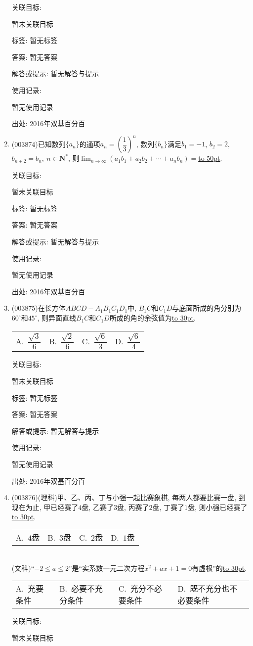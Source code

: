 \documentclass[10pt,a4paper]{article}
\newcommand{\blank}[1]{\underline{\hbox to #1pt{}}}
\newcommand{\fourch}[4]{\par\begin{tabular}{p{.23\textwidth}p{.23\textwidth}p{.23\textwidth}p{.23\textwidth}}
A.~#1 &B.~#2& C.~#3& D.~#4
\end{tabular}}
\begin{document}
\begin{enumerate}[1.]
关联目标:

暂未关联目标



标签: 暂无标签

答案: 暂无答案

解答或提示: 暂无解答与提示

使用记录:

暂无使用记录


出处: 2016年双基百分百
\item { (003874)}已知数列$\{a_n\}$的通项$a_n=\left(\dfrac 13\right)^n$, 数列$\{b_n\}$满足$b_1=-1$, $b_2=2$, $b_{n+2}=b_n, \ n\in \mathbf{N}^*$, 则$\displaystyle\lim_{n\to \infty}(a_1b_1+a_2b_2+\cdots+a_nb_n)=$\blank{50}.


关联目标:

暂未关联目标



标签: 暂无标签

答案: 暂无答案

解答或提示: 暂无解答与提示

使用记录:

暂无使用记录


出处: 2016年双基百分百
\item { (003875)}在长方体$ABCD-A_1B_1C_1D_1$中, $B_1C$和$C_1D$与底面所成的角分别为$60^\circ$和$45^\circ$, 则异面直线$B_1C$和$C_1D$所成的角的余弦值为\blank{30}.
\fourch{$\dfrac{\sqrt{3}}6$}{$\dfrac{\sqrt{2}}{6}$}{$\dfrac{\sqrt{6}}{3}$}{$\dfrac{\sqrt{6}}{4}$}


关联目标:

暂未关联目标



标签: 暂无标签

答案: 暂无答案

解答或提示: 暂无解答与提示

使用记录:

暂无使用记录


出处: 2016年双基百分百
\item { (003876)}(理科)甲、乙、丙、丁与小强一起比赛象棋, 每两人都要比赛一盘, 到现在为止, 甲已经赛了$4$盘, 乙赛了$3$盘, 丙赛了$2$盘, 丁赛了$1$盘, 则小强已经赛了\blank{30}.
\fourch{$4$盘}{$3$盘}{$2$盘}{$1$盘}\\
(文科)``$-2\le a\le 2$''是``实系数一元二次方程$x^2+ax+1=0$有虚根''的\blank{30}.
\fourch{充要条件}{必要不充分条件}{充分不必要条件}{既不充分也不必要条件}


关联目标:

暂未关联目标




\end{enumerate}
\end{document}
